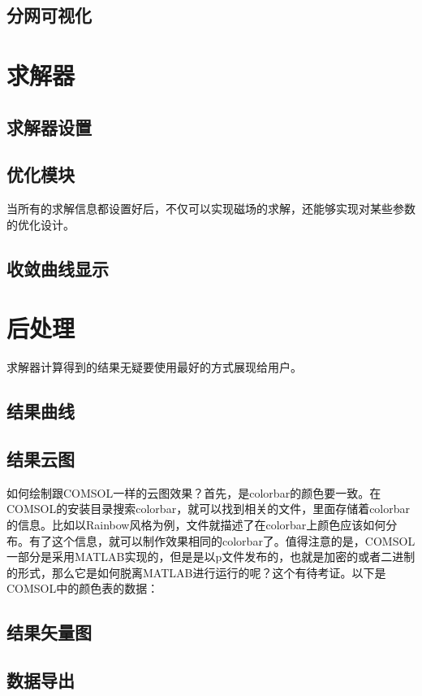 \subsection{分网可视化}

\section{求解器}

\subsection{求解器设置}

\subsection{优化模块}
当所有的求解信息都设置好后，不仅可以实现磁场的求解，还能够实现对某些参数的优化设计。

\subsection{收敛曲线显示}

\section{后处理}
求解器计算得到的结果无疑要使用最好的方式展现给用户。
\subsection{结果曲线}

\subsection{结果云图}
如何绘制跟COMSOL一样的云图效果？首先，是colorbar的颜色要一致。在COMSOL的安装目录搜索colorbar，就可以找到相关的文件，里面存储着colorbar的信息。比如以Rainbow风格为例，文件就描述了在colorbar上颜色应该如何分布。有了这个信息，就可以制作效果相同的colorbar了。值得注意的是，COMSOL一部分是采用MATLAB实现的，但是是以p文件发布的，也就是加密的或者二进制的形式，那么它是如何脱离MATLAB进行运行的呢？这个有待考证。以下是COMSOL中的颜色表的数据：

\subsection{结果矢量图}

\subsection{数据导出}